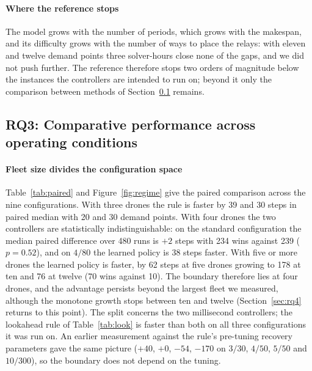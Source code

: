 \documentclass[final,5p,times,twocolumn]{elsarticle}
\begin{document}
\paragraph{Where the reference stops}
The model grows with the number of periods, which grows with the makespan, and its difficulty
grows with the number of ways to place the relays: with eleven and twelve demand points three
solver-hours close none of the gaps, and we did not push further. The reference therefore stops
two orders of magnitude below the instances the controllers are intended to run on; beyond it only
the comparison between methods of Section~\ref{sec:rq3} remains.

\subsection{RQ3: Comparative performance across operating conditions}
\label{sec:rq3}

\paragraph{Fleet size divides the configuration space}
Table~\ref{tab:paired} and Figure~\ref{fig:regime} give the paired comparison across the nine
configurations. With three drones the rule is faster by 39 and 30 steps in paired median with 20 and
30 demand points. With four drones the two controllers are statistically indistinguishable: on the standard configuration the
median paired difference over 480 runs is $+2$ steps with 234 wins against 239
($p = 0.52$), and on $4/80$ the learned policy is 38 steps faster. With five or more drones the
learned policy is faster, by 62 steps at five drones growing to 178 at ten and 76 at twelve
(70 wins against 10). The boundary therefore lies at four drones, and the advantage persists
beyond the largest fleet we measured, although the monotone growth stops between ten and twelve
(Section~\ref{sec:rq4} returns to this point). The split concerns the two millisecond
controllers; the lookahead rule of Table~\ref{tab:look} is faster than both on all three
configurations it was run on.
An earlier measurement against
the rule's pre-tuning recovery parameters gave the same picture ($+40$, $+0$, $-54$, $-170$ on
$3/30$, $4/50$, $5/50$ and $10/300$), so the boundary does not depend on the tuning.

\begin{table}[t]
\centering
\caption{Paired comparison on identical instances. Positive differences mean the learned policy
is slower than the rule. $p$ from the Wilcoxon signed-rank test on both-completed pairs.}
\label{tab:paired}
\small

\end{table}
\end{document}
